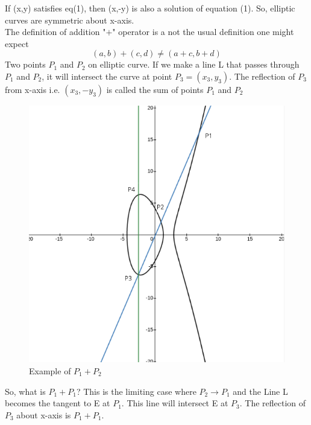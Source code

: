 \documentclass[a4paper,12pt]{report}
\begin{document}
If (x,y) satisfies eq(1), then (x,-y) is also a solution of equation (1). So, elliptic curves are symmetric about x-axis. \\
The definition of addition "$+$" operator is a not the usual definition one might expect
$$(a,b)+(c,d) \neq (a+c,b+d)$$
Two points $P_1$ and $P_2$ on elliptic curve. If we make a line L that passes through $P_1$ and $P_2$, it will intersect the curve at point $P_3=(x_3,y_3)$. The reflection of $P_3$ from x-axis i.e. $(x_3,-y_3)$ is called the sum of points $P_1$ and $P_2$
\begin{figure}[h!]
	\begin{center}
		\caption{Example of $P_1+P_2$}
		\includegraphics[scale=0.4]{2}
	\end{center}
\end{figure}
So, what is $P_1+P_1$? This is the limiting case where $P_2 \to P_1$ and the Line L becomes the tangent to E at $P_1$. This line will intersect E at $P_3$. The reflection of $P_3$ about x-axis  is $P_1+P_1$.
\end{document}
